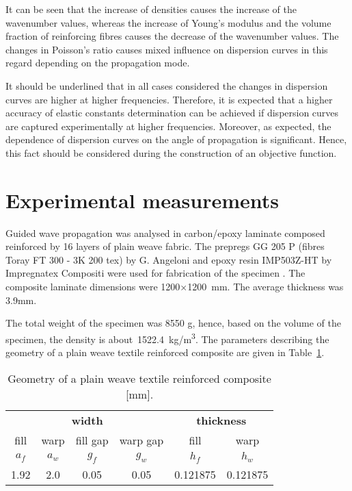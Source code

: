 \documentclass[preprint,12pt]{elsarticle}
\providecommand{\DIFaddtex}[1]{{\protect\color{blue}\uwave{#1}}} %
\providecommand{\DIFaddbegin}{} %
\providecommand{\DIFaddend}{} %
\providecommand{\DIFadd}[1]{\texorpdfstring{\DIFaddtex{#1}}{#1}} %
\begin{document}
It can be seen that the increase of densities causes the increase of the wavenumber values, whereas the increase of  Young's modulus and the volume fraction of reinforcing fibres causes the decrease of the wavenumber values. The changes in Poisson's ratio causes mixed influence on dispersion curves in this regard depending on the propagation mode.

It should be underlined that in all cases considered the changes in dispersion curves are higher at higher frequencies. Therefore, it is expected that a higher accuracy of elastic constants determination can be achieved if dispersion curves are captured experimentally at higher frequencies. Moreover, as expected, the dependence of dispersion curves on the angle of propagation is significant. Hence, this fact should be considered during the construction of an objective function.
\section{Experimental measurements \label{sec:experiment}}
Guided wave propagation was analysed in carbon/epoxy laminate composed reinforced by 16 layers of plain weave fabric. The prepregs GG 205  P (fibres Toray FT 300 - 3K 200 tex) by G. Angeloni and epoxy resin IMP503Z-HT by Impregnatex Compositi were used for fabrication of the specimen \DIFaddbegin \DIFadd{in the autoclave}\DIFaddend . The composite laminate dimensions were 1200$\times$1200~mm. The average thickness was 3.9\DIFaddbegin \DIFadd{$\pm$0.1 }\DIFaddend mm. 

The total weight of the specimen was 8550 g, hence, based on the volume of the specimen, the density is about~1522.4~kg/m\textsuperscript{3}.
The parameters describing the geometry of a plain weave textile reinforced composite are given in Table~\ref{tab:weave_geo}. 
 \begin{table}[h]
	\renewcommand{\arraystretch}{1.3}
	\centering \footnotesize
	\caption{Geometry of a plain weave textile reinforced composite [mm].}
	\begin{tabular}{cccccc} 
		\toprule
		\multicolumn{4}{c}{\textbf{width} }	& \multicolumn{2}{c}{\textbf{thickness} }  \\ 
	    \cmidrule(lr){1-4} \cmidrule(lr){5-6} 
		fill & warp & fill gap& warp gap& fill & warp\\
		$a_f$ &$a_w$& $g_f$  & $g_w$  & $h_f$& $h_w$ \\ 
		\cmidrule(lr){1-2} \cmidrule(lr){3-4} \cmidrule(lr){5-6}
		1.92 &2.0& 0.05& 0.05 & 0.121875 & 0.121875 \\
		\bottomrule 
	\end{tabular} 
	\label{tab:weave_geo}
\end{table}
\end{document}
